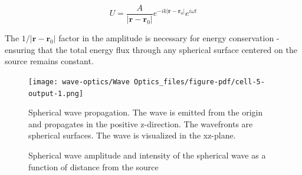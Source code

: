 \documentclass[
  a4paper,
]{book}
\begin{document}
\begin{equation}
U=\frac{A}{|\mathbf{r}-\mathbf{r}_0|}e^{-ik|\mathbf{r}-\mathbf{r}_0|} e^{i\omega t}
\end{equation}

\begin{tcolorbox}[enhanced jigsaw, coltitle=black, title=\textcolor{quarto-callout-important-color}{\faExclamation}\hspace{0.5em}{Important}, colframe=quarto-callout-important-color-frame, toprule=.15mm, opacitybacktitle=0.6, left=2mm, opacityback=0, breakable, toptitle=1mm, bottomtitle=1mm, leftrule=.75mm, arc=.35mm, titlerule=0mm, colbacktitle=quarto-callout-important-color!10!white, rightrule=.15mm, bottomrule=.15mm, colback=white]

The \(1/|\mathbf{r}-\mathbf{r}_0|\) factor in the amplitude is necessary
for energy conservation - ensuring that the total energy flux through
any spherical surface centered on the source remains constant.

\end{tcolorbox}

\begin{figure}[H]

{\centering \texttt{[image: wave-optics/Wave Optics\_files/figure-pdf/cell-5-output-1.png]}

}

\caption{Spherical wave propagation. The wave is emitted from the origin
and propagates in the positive z-direction. The wavefronts are spherical
surfaces. The wave is visualized in the xz-plane.}

\end{figure}%

\begin{figure}


\caption{\label{fig-spherical-amplitude}Spherical wave amplitude and
intensity of the spherical wave as a function of distance from the
source}

\end{figure}%
\end{document}
